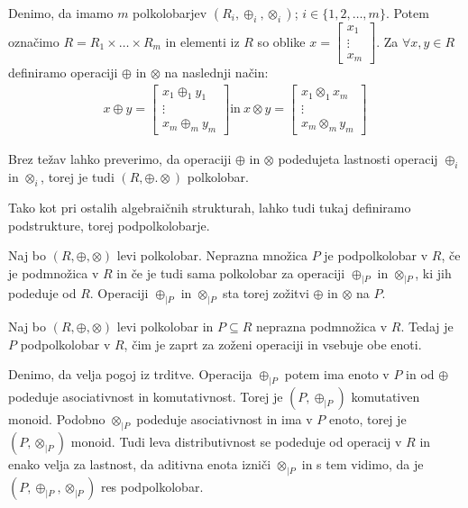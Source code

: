\documentclass[mat1]{fmfdelo}
\begin{document}
\begin{zgled}
	\label{zgled:prodpolkolobar}
Denimo, da imamo $m$ polkolobarjev $(R_{i}, \oplus_{i}, \otimes_{i})$; $i\in \{1, 2, \ldots, m\}$. Potem označimo $R = R_1 \times \ldots \times R_m$ in elementi iz $R$ so oblike $x = \begin{bmatrix}
	x_1 \\
	\vdots \\
	x_m
\end{bmatrix}$. Za $\forall x, y\in R$ definiramo operaciji $\oplus$ in $\otimes$ na naslednji način:
\begin{align*}
	x \oplus y = \begin{bmatrix}
		x_1 \oplus_{1} y_1 \\
		\vdots \\
		x_m \oplus_{m} y_m
	\end{bmatrix} \text{in}~ x \otimes y = \begin{bmatrix}
		x_1 \otimes_{1} x_m \\
		\vdots \\
		x_m \otimes_{m} y_m
	\end{bmatrix}
\end{align*}

Brez težav lahko preverimo, da operaciji $\oplus$ in $\otimes$ podedujeta lastnosti operacij $\oplus_{i}$ in $\otimes_{i}$, torej je tudi $(R, \oplus. \otimes)$ polkolobar.
\end{zgled}

Tako kot pri ostalih algebraičnih strukturah, lahko tudi tukaj definiramo podstrukture, torej podpolkolobarje.

\begin{definicija}
	Naj bo $(R, \oplus, \otimes)$ levi polkolobar. Neprazna množica $P$ je podpolkolobar v $R$, če je podmnožica v $R$ in če je tudi sama polkolobar za operaciji $\oplus_{|P}$ in $\otimes_{|P}$, ki jih podeduje od $R$. Operaciji $\oplus_{|P}$ in $\otimes_{|P}$ sta torej zožitvi $\oplus$ in $\otimes$ na $P$.
\end{definicija}

\begin{trditev}
	Naj bo $(R, \oplus, \otimes)$ levi polkolobar in $P\subseteq R$ neprazna podmnožica v $R$. Tedaj je $P$ podpolkolobar v $R$, čim je zaprt za zoženi operaciji in vsebuje obe enoti.
\end{trditev}
\begin{dokaz}
	Denimo, da velja pogoj iz trditve. Operacija $\oplus_{|P}$ potem ima enoto v $P$ in od $\oplus$ podeduje asociativnost in komutativnost. Torej je $(P, \oplus_{|P})$ komutativen monoid. Podobno $\otimes_{|P}$ podeduje asociativnost in ima v $P$ enoto, torej je $(P, \otimes_{|P})$ monoid.
	Tudi leva distributivnost se podeduje od operacij v $R$ in enako velja za lastnost, da aditivna enota izniči $\otimes_{|P}$ in s tem vidimo, da je $(P, \oplus_{|P}, \otimes_{|P})$ res podpolkolobar.
\end{dokaz}
\end{document}
